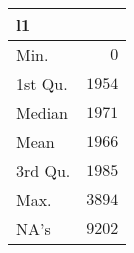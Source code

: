 %
\begin{table}[!tbp]
\begin{center}
\begin{tabular}{lr}
\hline\hline
\multicolumn{1}{l}{l1}&\multicolumn{1}{c}{}\tabularnewline
\hline
Min.&$   0$\tabularnewline
1st Qu.&$1954$\tabularnewline
Median&$1971$\tabularnewline
Mean&$1966$\tabularnewline
3rd Qu.&$1985$\tabularnewline
Max.&$3894$\tabularnewline
NA's&$9202$\tabularnewline
\hline
\end{tabular}
\end{center}
\end{table}

